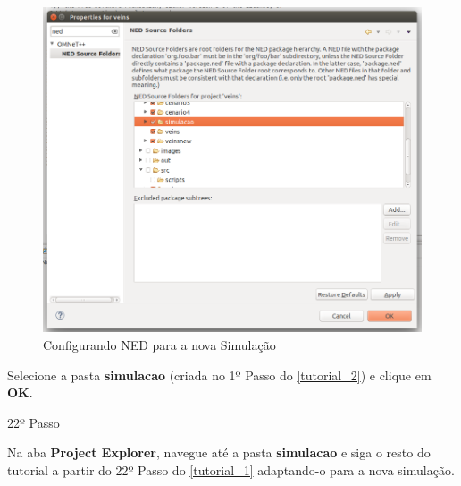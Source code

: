 \documentclass[
12pt,				%
openright,			%
oneside,			%
a4paper,			%
brazil,				%
]{abntex2}
\begin{document}
{\begin{anexosenv}
                \begin{figure} [H]
	                \centering
	                \includegraphics[scale=.35]{figuras/aneC/76NedFolder}
	                \caption{\label{fig_76}Configurando NED para a nova Simulação}
                \end{figure}
                
                \par Selecione a pasta \textbf{simulacao} (criada no 1º Passo do \autoref{tutorial_2}) e clique em \textbf{OK}. %
                
        	
            	\begin{description}
                    \item[22º Passo]
                \end{description}
                \par Na aba \textbf{Project Explorer}, navegue até a pasta \textbf{simulacao} e siga o resto do tutorial a partir do 22º Passo do \autoref{tutorial_1} adaptando-o para a nova simulação. %
		            

\end{anexosenv}}
\end{document}
